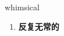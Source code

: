 
\begin{frame}
{\huge whimsical}
\begin{center}
\begin{enumerate}\Large
  \item \textbf{反复无常的}
\end{enumerate}
\end{center}
\end{frame}
